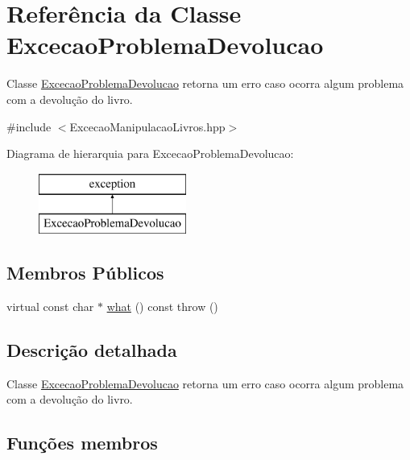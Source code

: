 \hypertarget{class_excecao_problema_devolucao}{}\section{Referência da Classe Excecao\+Problema\+Devolucao}
\label{class_excecao_problema_devolucao}


Classe \mbox{\hyperlink{class_excecao_problema_devolucao}{Excecao\+Problema\+Devolucao}} retorna um erro caso ocorra algum problema com a devolução do livro.  




{\ttfamily \#include $<$Excecao\+Manipulacao\+Livros.\+hpp$>$}

Diagrama de hierarquia para Excecao\+Problema\+Devolucao\+:\begin{figure}[H]
\begin{center}
\leavevmode
\includegraphics[height=2.000000cm]{class_excecao_problema_devolucao}
\end{center}
\end{figure}
\subsection*{Membros Públicos}
\begin{DoxyCompactItemize}
\item 
virtual const char $\ast$ \mbox{\hyperlink{class_excecao_problema_devolucao_ac31cc6f83569bd729bf4253d9cad59f5}{what}} () const  throw ()
\end{DoxyCompactItemize}


\subsection{Descrição detalhada}
Classe \mbox{\hyperlink{class_excecao_problema_devolucao}{Excecao\+Problema\+Devolucao}} retorna um erro caso ocorra algum problema com a devolução do livro. 

\subsection{Funções membros}
\mbox{\label{class_excecao_problema_devolucao_ac31cc6f83569bd729bf4253d9cad59f5}} 
